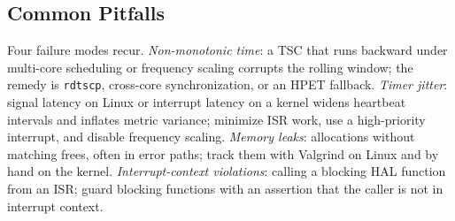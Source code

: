 \subsection{Common Pitfalls}

Four failure modes recur. \emph{Non-monotonic time}: a TSC that runs backward
under multi-core scheduling or frequency scaling corrupts the rolling window;
the remedy is \texttt{rdtscp}, cross-core synchronization, or an HPET fallback.
\emph{Timer jitter}: signal latency on Linux or interrupt latency on a kernel
widens heartbeat intervals and inflates metric variance; minimize ISR work, use
a high-priority interrupt, and disable frequency scaling. \emph{Memory leaks}:
allocations without matching frees, often in error paths; track them with
Valgrind on Linux and by hand on the kernel. \emph{Interrupt-context
violations}: calling a blocking HAL function from an ISR; guard blocking
functions with an assertion that the caller is not in interrupt context.
